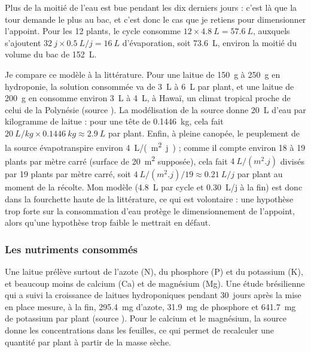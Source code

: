 Plus de la moitié de l'eau est bue pendant les dix derniers jours : c'est là que la tour demande le plus au bac, et c'est donc le cas que je retiens pour dimensionner l'appoint. Pour les 12 plants, le cycle consomme $12 \times \qty{4,8}{L} = \qty{57,6}{L}$, auxquels s'ajoutent $\qty{32}{j} \times \qty{0,5}{L/j} = \qty{16}{L}$ d'évaporation, soit \qty{73,6}{L}, environ la moitié du volume du bac de \qty{152}{L}.

Je compare ce modèle à la littérature. Pour une laitue de \qty{150}{g} à \qty{250}{g} en hydroponie, la solution consommée va de \qty{3}{L} à \qty{6}{L} par plant, et une laitue de \qty{200}{g} en consomme environ \qty{3}{L} à \qty{4}{L}, à Hawaï, un climat tropical proche de celui de la Polynésie (source ). La modélisation de la source  donne \qty{20}{L} d'eau par kilogramme de laitue : pour une tête de \qty{0,1446}{kg}, cela fait $\qty{20}{L/kg}\times\qty{0,1446}{kg} \approx \qty{2,9}{L}$ par plant. Enfin, à pleine canopée, le peuplement de la source  évapotranspire environ \qty{4}{L/(m^2.j)} ; comme il compte environ 18 à 19 plants par mètre carré (surface de \qty{20}{m^2} supposée), cela fait $\qty{4}{L/(m^2.j)}$ divisés par 19 plants par mètre carré, soit $\qty{4}{L/(m^2.j)}/19 \approx \qty{0,21}{L/j}$ par plant au moment de la récolte. Mon modèle (\qty{4,8}{L} par cycle et \qty{0,30}{L/j} à la fin) est donc dans la fourchette haute de la littérature, ce qui est volontaire : une hypothèse trop forte sur la consommation d'eau protège le dimensionnement de l'appoint, alors qu'une hypothèse trop faible le mettrait en défaut.

\subsubsection*{Les nutriments consommés}

Une laitue prélève surtout de l'azote (N), du phosphore (P) et du potassium (K), et beaucoup moins de calcium (Ca) et de magnésium (Mg). Une étude brésilienne qui a suivi la croissance de laitues hydroponiques pendant \qty{30}{jours} après la mise en place mesure, à la fin, \qty{295,4}{mg} d'azote, \qty{31,9}{mg} de phosphore et \qty{641,7}{mg} de potassium par plant (source ). Pour le calcium et le magnésium, la source  donne les concentrations dans les feuilles, ce qui permet de recalculer une quantité par plant à partir de la masse sèche.

